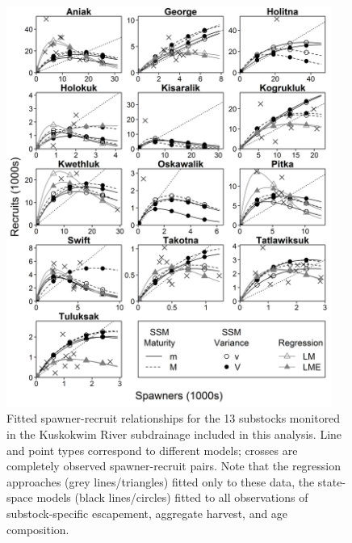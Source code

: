 \documentclass[12pt,]{book}
\theoremstyle{definition}
\theoremstyle{definition}
\theoremstyle{definition}
\theoremstyle{remark}
\begin{document}
\begin{figure}
  \centering
  \includegraphics[width=0.95\textwidth]{img/Ch4/R-v-S.jpg}
  \caption{Fitted spawner-recruit relationships for the 13 substocks monitored in the Kuskokwim River subdrainage included in this analysis. Line and point types correspond to different models; crosses are completely observed spawner-recruit pairs. Note that the regression approaches (grey lines/triangles) fitted only to these data, the state-space models (black lines/circles) fitted to all observations of substock-specific escapement, aggregate harvest, and age composition.}
  \label{fig:r-v-s}
\end{figure}

\clearpage
\end{document}
